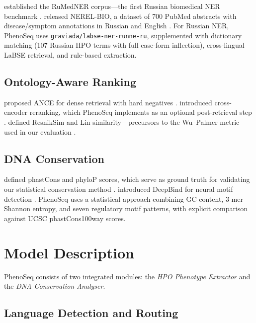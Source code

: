\documentclass[11pt,a4paper]{article}
\begin{document}
\citeauthor{miftah2017} established the RuMedNER corpus---the first Russian
biomedical NER benchmark \cite{miftah2017}.  \citeauthor{louka2021} released
NEREL-BIO, a dataset of 700 PubMed abstracts with disease/symptom annotations
in Russian and English \cite{louka2021}.  For Russian NER, PhenoSeq uses
\texttt{graviada/labse-ner-runne-ru}, supplemented with dictionary matching
(107 Russian HPO terms with full case-form inflection), cross-lingual LaBSE
retrieval, and rule-based extraction.

\subsection{Ontology-Aware Ranking}

\citeauthor{xiong2021} proposed ANCE for dense retrieval with hard negatives
\cite{xiong2021}.  \citeauthor{nogueira2020} introduced cross-encoder
reranking, which PhenoSeq implements as an optional post-retrieval step
\cite{nogueira2020}.  \citeauthor{kohler2009} defined ResnikSim and Lin
similarity---precursors to the Wu--Palmer metric used in our evaluation
\cite{kohler2009}.

\subsection{DNA Conservation}

\citeauthor{pollard2010} defined phastCons and phyloP scores, which serve as
ground truth for validating our statistical conservation method
\cite{pollard2010}.  \citeauthor{alipanahi2015} introduced DeepBind for neural
motif detection \cite{alipanahi2015}.  PhenoSeq uses a statistical approach
combining GC content, 3-mer Shannon entropy, and seven regulatory motif
patterns, with explicit comparison against UCSC phastCons100way scores.

\section{Model Description}

PhenoSeq consists of two integrated modules: the \emph{HPO Phenotype Extractor}
and the \emph{DNA Conservation Analyser}.

\subsection{Language Detection and Routing}
\end{document}
